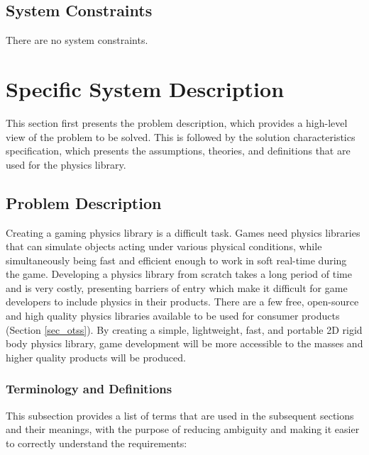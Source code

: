 \documentclass[12pt]{article}
\begin{document}
\subsection{System Constraints}

There are no system constraints.


%
%

\section{Specific System Description}

This section first presents the problem description, which provides a high-level
view of the problem to be solved. This is followed by the solution
characteristics specification, which presents the assumptions, theories, 
and definitions that are used for the physics library.

\subsection{Problem Description} \label{Sec_pd}

Creating a gaming physics library is a difficult task. Games need 
physics libraries that can simulate objects acting under various physical conditions, while simultaneously being fast and efficient enough to
work in soft real-time during the game. Developing a physics library from scratch
takes a long period of time and is very costly, presenting barriers of entry which make it difficult for game developers to include physics in their products. There are a few free, open-source and high quality physics libraries available to be used for consumer products (Section \ref{sec_otss}). By creating a simple, lightweight, fast, and portable 2D rigid body physics library, game development will be more accessible to the masses and higher quality products will be produced.

\subsubsection{Terminology and Definitions}

This subsection provides a list of terms that are used in the subsequent
sections and their meanings, with the purpose of reducing ambiguity and making it
easier to correctly understand the requirements:
\end{document}

